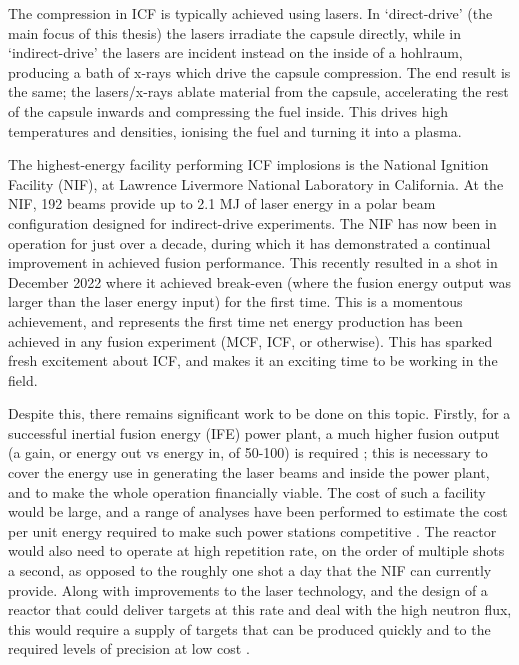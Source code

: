 The compression in ICF is typically achieved using lasers. In `direct-drive' (the main focus of this thesis) the lasers irradiate the capsule directly, while in `indirect-drive' the lasers are incident instead on the inside of a hohlraum, producing a bath of x-rays which drive the capsule compression. The end result is the same; the lasers/x-rays ablate material from the capsule, accelerating the rest of the capsule inwards and compressing the fuel inside. This drives high temperatures and densities, ionising the fuel and turning it into a plasma.

The highest-energy facility performing ICF implosions is the National Ignition Facility (NIF), at Lawrence Livermore National Laboratory in California. At the NIF, 192 beams provide up to 2.1 MJ of laser energy in a polar beam configuration designed for indirect-drive experiments. The NIF has now been in operation for just over a decade, during which it has demonstrated a continual improvement in achieved fusion performance. This recently resulted in a shot in December 2022 where it achieved break-even (where the fusion energy output was larger than the laser energy input) for the first time. This is a momentous achievement, and represents the first time net energy production has been achieved in any fusion experiment (MCF, ICF, or otherwise). This has sparked fresh excitement about ICF, and makes it an exciting time to be working in the field.

Despite this, there remains significant work to be done on this topic. Firstly, for a successful inertial fusion energy (IFE) power plant, a much higher fusion output (a gain, or energy out vs energy in, of 50-100) is required \cite{Campbell2017}; this is necessary to cover the energy use in generating the laser beams and inside the power plant, and to make the whole operation financially viable. The cost of such a facility would be large, and a range of analyses have been performed to estimate the cost per unit energy required to make such power stations competitive \cite{Tynan2020, Gi2020}. The reactor would also need to operate at high repetition rate, on the order of multiple shots a second, as opposed to the roughly one shot a day that the NIF can currently provide. Along with improvements to the laser technology, and the design of a reactor that could deliver targets at this rate and deal with the high neutron flux, this would require a supply of targets that can be produced quickly and to the required levels of precision at low cost \cite{Nuckolls2010}.

